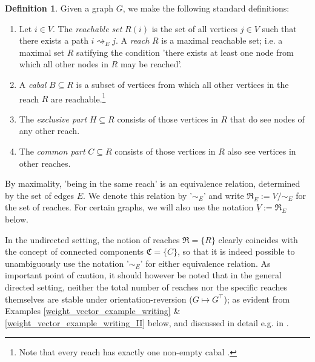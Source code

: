 \documentclass[reqno,12pt,letterpaper]{amsart}
\numberwithin{equation}{section}
\newcommand{\1}{\mathds{1}}
\theoremstyle{definition}
\newtheorem{Def}[Th]{Definition}
\begin{document}
\begin{Def} \label{def:reaches}
Given a graph $G$, we make the following standard definitions:
	\begin{enumerate}[label=(\roman*), topsep=0pt, itemsep=-1em]	
		\item Let \( i \in V \). The \emph{reachable set} \( R(i) \) is the set of all vertices \( j \in V \) such that there exists a path \( i \rightsquigarrow_E j \). A \emph{reach} \( R \) is a maximal reachable set; i.e. a maximal set $R$ satifying the condition 'there exists at least one node from which all other nodes in $R$ may be reached'.	\\
		\item A \emph{cabal} \( B \subseteq R \) is a subset of vertices from which all other vertices in the reach \( R \) are reachable.\footnote{Note that every reach has exactly one non-empty cabal \cite{Veerman2020APO}.}\\ 
		\item The \emph{exclusive part} \( H \subseteq R \) consists of those vertices in \( R \) that do see nodes of any other reach.\\
		\item The \emph{common part} \( C \subseteq R \) consists of those vertices in \( R \) also see vertices in other reaches.
	\end{enumerate} 
By maximality, 'being in the same reach' is an equivalence relation, determined by the set of edges $E$.  We denote this relation by '$\sim_{{E}}$' and write  $\mathfrak{R}_{{E}} := V/\sim_{E}$ for the set of reaches.
 For certain graphs, we will also use the notation $\underline{V}:= \mathfrak{R}_{E} $ below.
\end{Def}


\medskip

In the undirected setting, the notion of reaches $\mathfrak{R} = \{R\}$ clearly coincides with the concept of connected components $\mathfrak{C} = \{C\}$, so that it is indeed possible to unambiguously use the notation  '$\sim_E$' for either equivalence relation.
As important point of caution, it should however be noted that in the general directed setting, neither the total number of reaches nor the specific reaches themselves are stable under orientation-reversion ($G \mapsto G^{\intercal}$); as evident from Examples \ref{weight_vector_example_writing} \& \ref{weight_vector_example_writing_II} below, and discussed in detail e.g.  in \cite[Section 2]{Veerman2020APO}. 
\end{document}
